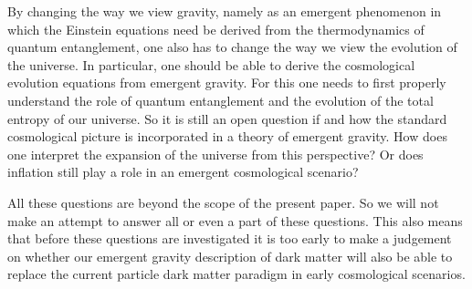 \documentclass[a4paper,12pt]{article}
\begin{document}
  By changing the way we view gravity, 
  namely as an emergent phenomenon in which the Einstein equations need be derived from 
  the thermodynamics of quantum entanglement, one also  has to change the way we  view the evolution of the universe.  In particular, one should be able to derive the cosmological evolution equations from emergent gravity. For this one needs to first  properly understand the role of quantum entanglement and the evolution of the total entropy of our universe. So it is still an open question if and how the standard cosmological picture is incorporated in a theory of emergent gravity.  How does one interpret the expansion of the universe from this perspective? Or does inflation still play a role in an emergent cosmological scenario? 

All these questions are beyond the scope of the present paper. So we will not make an attempt to answer all or even a part of these questions. This also means that before these questions are investigated it is too early to make a judgement on whether our emergent gravity description of dark matter will also be able to replace the current particle dark matter paradigm in early cosmological scenarios.

\end{document}
